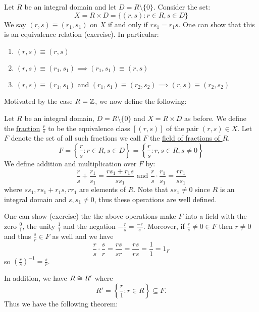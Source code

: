 \documentclass[11pt]{article}
\begin{document}
\begin{note}
    Let $R$ be an integral domain and let $D=R\setminus\{0\}$. Consider the set:
    \[X=R\times D=\{(r,s):r\in R,s\in D\}\]
    We say $(r,s)\equiv(r_1,s_1)$ on $X$ if and only if $rs_1=r_1s$. One can show that this is an equivalence relation (exercise). In particular:
    \begin{enumerate}
        \item $(r,s)\equiv(r,s)$
        \item $(r,s)\equiv(r_1,s_1)\implies(r_1,s_1)\equiv(r,s)$
        \item $(r,s)\equiv(r_1,s_1)$ and $(r_1,s_1)\equiv(r_2,s_2)\implies(r,s)\equiv(r_2,s_2)$
    \end{enumerate}
\end{note}

Motivated by the case $R=\mathbb{Z}$, we now define the following:

\begin{definition}
    Let $R$ be an integral domain, $D=R\setminus\{0\}$ and $X=R\times D$ as before. We define the \ul{fraction} $\frac rs$ to be the equivalence class $[(r,s)]$ of the pair $(r,s)\in X$. Let $F$ denote the set of all such fractions we call $F$ the \ul{field of fractions of $R$}.
    \[F=\left\{\frac rs:r\in R,s\in D\right\}=\left\{\frac rs:r,s\in R,s\neq0\right\}\]
    We define addition and multiplication over $F$ by:
    \[\frac rs+\frac{r_1}{s_1}=\frac{rs_1+r_1s}{ss_1}\text{ and }\frac rs\cdot\frac{r_1}{s_1}=\frac{rr_1}{ss_1}\]
    where $ss_1,rs_1+r_1s,rr_1$ are elements of $R$. Note that $ss_1\neq0$ since $R$ is an integral domain and $s,s_1\neq0$, thus these operations are well defined.
\end{definition}

\begin{example}
    One can show (exercise) the the above operations make $F$ into a field with the zero $\frac01$, the unity $\frac11$ and the negation $-\frac{r}{s}=\frac{-r}{s}$. Moreover, if $\frac{r}{s}\neq 0\in F$ then $r\neq0$ and thus $\frac sr\in F$ as well and we have
    \[\frac rs\cdot\frac sr=\frac{rs}{sr}=\frac{rs}{rs}=\frac{1}{1}=1_F\]
    so $\left(\frac rs\right)^{-1}=\frac{s}{r}$.
\end{example}

\begin{remark}
    In addition, we have $R\cong R'$ where
    \[R'=\left\{\frac r1:r\in R\right\}\subseteq F.\]
    Thus we have the following theorem:
\end{remark}
\end{document}
